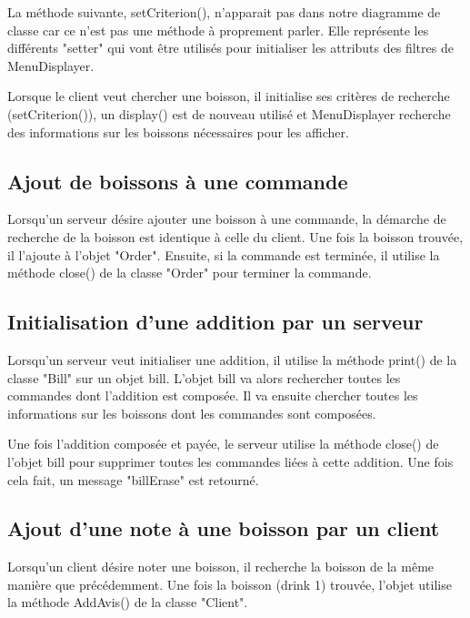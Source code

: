La méthode suivante, setCriterion(), n'apparait pas dans notre diagramme de classe car ce n'est pas une méthode à proprement parler. Elle représente les différents "setter" qui vont être utilisés pour initialiser les attributs des filtres de MenuDisplayer. 

Lorsque le client veut chercher une boisson, il initialise ses critères de recherche (setCriterion()), un display() est de nouveau utilisé et MenuDisplayer recherche des informations sur les boissons nécessaires pour les afficher. 

\subsection{Ajout de boissons à une commande}

Lorsqu'un serveur désire ajouter une boisson à une commande, la démarche de recherche de la boisson est identique à celle du client. Une fois la boisson trouvée, il l'ajoute à l'objet "Order". Ensuite, si la commande est terminée, il utilise la méthode close() de la classe "Order" pour terminer la commande.


\subsection{Initialisation d'une addition par un serveur}
Lorsqu'un serveur veut initialiser une addition, il utilise la méthode print() de la classe "Bill" sur un objet bill. L'objet bill va alors rechercher toutes les commandes dont l'addition est composée. Il va ensuite chercher toutes les informations sur les boissons dont les commandes sont composées.

Une fois l'addition composée et payée, le serveur utilise la méthode close() de l'objet bill pour supprimer toutes les commandes liées à cette addition. Une fois cela fait, un message "billErase" est retourné.

\subsection{Ajout d'une note à une boisson par un client} 

Lorsqu'un client désire noter une boisson, il recherche la boisson de la même manière que précédemment. Une fois la boisson (drink 1) trouvée, l'objet utilise la méthode AddAvis() de la classe "Client".


